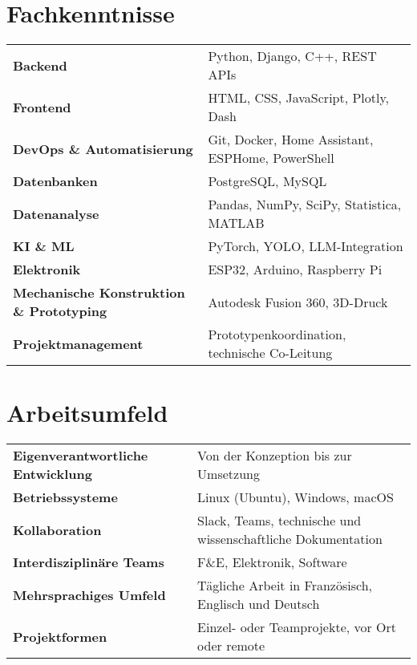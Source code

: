 \documentclass[verylight]{simplehipstercv}
\begin{document}
\begin{paracol}{2}
\vspace{1em}
\bigskip

\section*{Fachkenntnisse}
\begin{tabular}{>{\footnotesize\bfseries}l >{\footnotesize}p{}}
    Backend                  & Python, Django, C++, REST APIs \\
    Frontend                 & HTML, CSS, JavaScript, Plotly, Dash \\
    DevOps \& Automatisierung& Git, Docker, Home Assistant, ESPHome, PowerShell \\
    \hline
    Datenbanken              & PostgreSQL, MySQL \\
    Datenanalyse             & Pandas, NumPy, SciPy, Statistica, MATLAB\\
    KI \& ML                 & PyTorch, YOLO, LLM-Integration \\
    \hline
    Elektronik               & ESP32, Arduino, Raspberry Pi\\
    Mechanische Konstruktion \& Prototyping & Autodesk Fusion 360, 3D-Druck \\
    Projektmanagement        & Prototypenkoordination, technische Co-Leitung
\end{tabular}

\bigskip
\section*{Arbeitsumfeld}
\begin{tabular}{>{\footnotesize\bfseries}l >{\footnotesize}p{}}
    Eigenverantwortliche Entwicklung & Von der Konzeption bis zur Umsetzung\\
    Betriebssysteme                  & Linux (Ubuntu), Windows, macOS\\
    Kollaboration                    & Slack, Teams, technische und wissenschaftliche Dokumentation\\
    Interdisziplinäre Teams         & F\&E, Elektronik, Software\\
    Mehrsprachiges Umfeld           & Tägliche Arbeit in Französisch, Englisch und Deutsch\\
    Projektformen                   & Einzel- oder Teamprojekte, vor Ort oder remote\\
\end{tabular}


\end{paracol}
\end{document}

